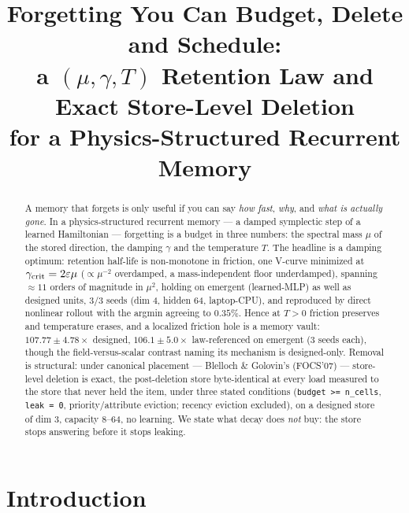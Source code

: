 \documentclass{article}
\title{Forgetting You Can Budget, Delete and Schedule:\\ a $(\mu,\gamma,T)$ Retention Law and Exact Store-Level Deletion\\ for a Physics-Structured Recurrent Memory}
\author{}
\begin{document}
\maketitle

\begin{abstract}
A memory that forgets is only useful if you can say \emph{how fast}, \emph{why}, and \emph{what is actually gone}. In a physics-structured recurrent memory --- a damped symplectic step of a learned Hamiltonian --- forgetting is a budget in three numbers: the spectral mass $\mu$ of the stored direction, the damping $\gamma$ and the temperature $T$. The headline is a damping optimum: retention half-life is non-monotone in friction, one V-curve minimized at $\gamma_{\rm crit}=2\varepsilon\mu$ ($\propto\mu^{-2}$ overdamped, a mass-independent floor underdamped), spanning $\approx11$ orders of magnitude in $\mu^2$, holding on emergent (learned-MLP) as well as designed units, 3/3 seeds (dim 4, hidden 64, laptop-CPU), and reproduced by direct nonlinear rollout with the argmin agreeing to $0.35\%$. Hence at $T>0$ friction preserves and temperature erases, and a localized friction hole is a memory vault: $107.77\pm4.78\times$ designed, $106.1\pm5.0\times$ law-referenced on emergent (3 seeds each), though the field-versus-scalar contrast naming its mechanism is designed-only. Removal is structural: under canonical placement --- Blelloch \& Golovin's (FOCS'07) --- store-level deletion is exact, the post-deletion store byte-identical at every load measured to the store that never held the item, under three stated conditions (\texttt{budget >= n\_cells}, \texttt{leak = 0}, priority/attribute eviction; recency eviction excluded), on a designed store of dim 3, capacity 8--64, no learning. We state what decay does \emph{not} buy: the store stops answering before it stops leaking.
\end{abstract}

\section{Introduction}\label{sec:intro}
\end{document}
